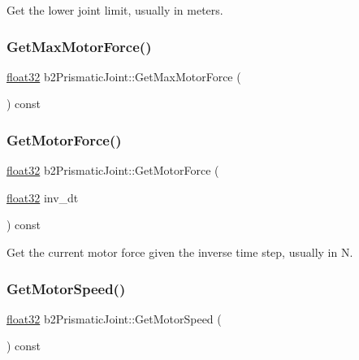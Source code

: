 Get the lower joint limit, usually in meters. 

\mbox{\label{classb2_prismatic_joint_aea8d0701bdf00a38fd2f24d94ae74842}} 
\subsubsection{\texorpdfstring{GetMaxMotorForce()}{GetMaxMotorForce()}}
{\footnotesize\ttfamily \mbox{\hyperlink{b2_settings_8h_aacdc525d6f7bddb3ae95d5c311bd06a1}{float32}} b2\+Prismatic\+Joint\+::\+Get\+Max\+Motor\+Force (\begin{DoxyParamCaption}{ }\end{DoxyParamCaption}) const\hspace{0.3cm}{\ttfamily [inline]}}

\mbox{\label{classb2_prismatic_joint_aaf7a7fe2300d9fe7a810306e9cfbb41a}} 
\subsubsection{\texorpdfstring{GetMotorForce()}{GetMotorForce()}}
{\footnotesize\ttfamily \mbox{\hyperlink{b2_settings_8h_aacdc525d6f7bddb3ae95d5c311bd06a1}{float32}} b2\+Prismatic\+Joint\+::\+Get\+Motor\+Force (\begin{DoxyParamCaption}\item[{\mbox{\hyperlink{b2_settings_8h_aacdc525d6f7bddb3ae95d5c311bd06a1}{float32}}}]{inv\+\_\+dt }\end{DoxyParamCaption}) const}



Get the current motor force given the inverse time step, usually in N. 

\mbox{\label{classb2_prismatic_joint_a869c6edeb62ed01237b2adb09da273ae}} 
\subsubsection{\texorpdfstring{GetMotorSpeed()}{GetMotorSpeed()}}
{\footnotesize\ttfamily \mbox{\hyperlink{b2_settings_8h_aacdc525d6f7bddb3ae95d5c311bd06a1}{float32}} b2\+Prismatic\+Joint\+::\+Get\+Motor\+Speed (\begin{DoxyParamCaption}{ }\end{DoxyParamCaption}) const\hspace{0.3cm}{\ttfamily [inline]}}



